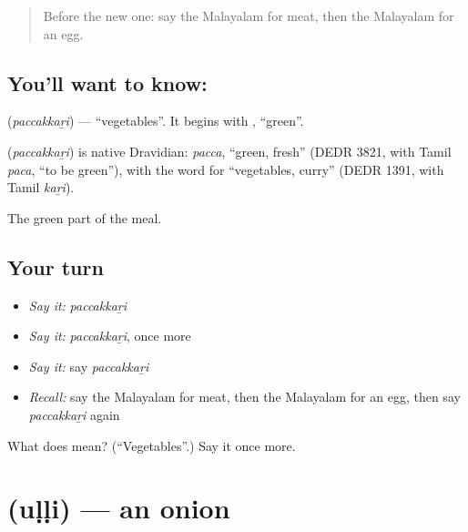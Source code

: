 \label{lesson:ML-C131-vegetables}



\begin{quote}
Before the new one: say the Malayalam for meat, then the Malayalam for an egg.
\end{quote}

\subsection*{You'll want to know: }
\textbf{} (\emph{paccakkaṟi}) — \textquotedblleft{}vegetables\textquotedblright{}. It begins with \textbf{}, \textquotedblleft{}green\textquotedblright{}.

\begin{cousinweb}
\textbf{} (\emph{paccakkaṟi}) is native Dravidian: \emph{pacca}, \textquotedblleft{}green, fresh\textquotedblright{} (DEDR 3821, with Tamil \emph{paca}, \textquotedblleft{}to be green\textquotedblright{}), with the word for \textquotedblleft{}vegetables, curry\textquotedblright{} (DEDR 1391, with Tamil \emph{kaṟi}).
\end{cousinweb}

\begin{grammarlens}[title={What you've built}]
The green part of the meal.
\end{grammarlens}

\subsection*{Your turn}
\begin{itemize}
\raggedright
  \item \emph{Say it:} \emph{paccakkaṟi}
  \item \emph{Say it:} \emph{paccakkaṟi}, once more
  \item \emph{Say it:} say \emph{paccakkaṟi}
  \item \emph{Recall:} say the Malayalam for meat, then the Malayalam for an egg, then say \emph{paccakkaṟi} again
\end{itemize}

\begin{tcolorbox}[breakable,colback=teal!4,colframe=teal!35!black,title={Before you move on}]
What does  mean? (\textquotedblleft{}Vegetables\textquotedblright{}.) Say it once more.
\end{tcolorbox}
\section[\texorpdfstring{\ml{ഉള്ളി} (uḷḷi)}{ഉള്ളി (uḷḷi)}]{ (uḷḷi) — an onion}

